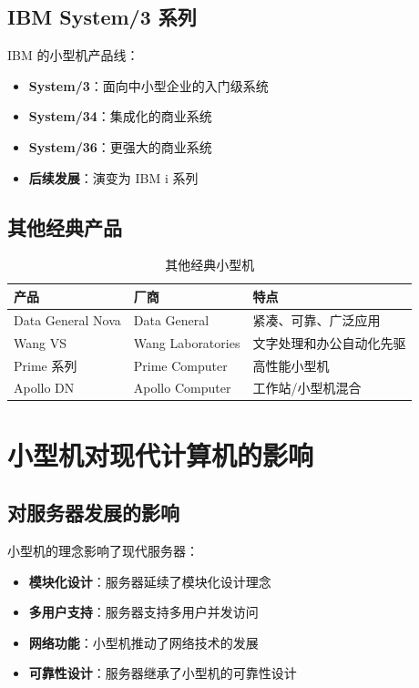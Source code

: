 \documentclass[12pt,UTF8]{ctexbook}
\begin{document}
\section{IBM System/3 系列}

IBM 的小型机产品线：

\begin{itemize}[leftmargin=2cm]
    \item \textbf{System/3}：面向中小型企业的入门级系统
    \item \textbf{System/34}：集成化的商业系统
    \item \textbf{System/36}：更强大的商业系统
    \item \textbf{后续发展}：演变为 IBM i 系列
\end{itemize}

\section{其他经典产品}

\begin{table}[htbp]
    \centering
    \caption{其他经典小型机}
    \begin{tabular}{|p{3cm}|p{3cm}|p{4cm}|}
        \hline
        \textbf{产品} & \textbf{厂商} & \textbf{特点} \\
        \hline
        Data General Nova & Data General & 紧凑、可靠、广泛应用 \\
        \hline
        Wang VS & Wang Laboratories & 文字处理和办公自动化先驱 \\
        \hline
        Prime 系列 & Prime Computer & 高性能小型机 \\
        \hline
        Apollo DN & Apollo Computer & 工作站/小型机混合 \\
        \hline
    \end{tabular}
\end{table}

\chapter{小型机对现代计算机的影响}
\label{chap:influence}

\section{对服务器发展的影响}

小型机的理念影响了现代服务器：

\begin{itemize}[leftmargin=2cm]
    \item \textbf{模块化设计}：服务器延续了模块化设计理念
    \item \textbf{多用户支持}：服务器支持多用户并发访问
    \item \textbf{网络功能}：小型机推动了网络技术的发展
    \item \textbf{可靠性设计}：服务器继承了小型机的可靠性设计
\end{itemize}
\end{document}
